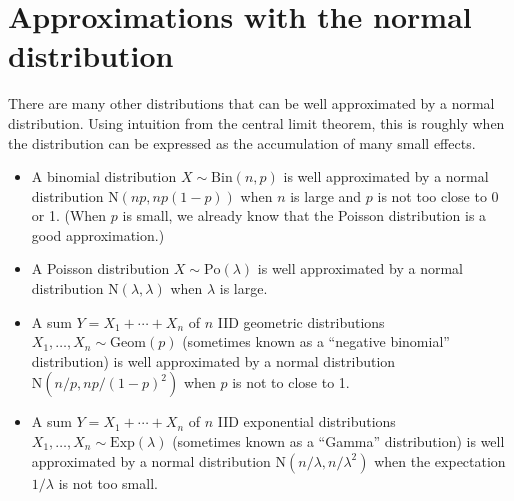 \documentclass[
  a4paper,
]{book}
\providecommand{\tightlist}{%
  \setlength{\itemsep}{0pt}\setlength{\parskip}{0pt}}
\theoremstyle{definition}
\theoremstyle{definition}
\theoremstyle{definition}
\theoremstyle{definition}
\theoremstyle{remark}
\begin{document}
\hypertarget{normal-approx}{%
\section{Approximations with the normal distribution}\label{normal-approx}}

There are many other distributions that can be well approximated by a normal distribution. Using intuition from the central limit theorem, this is roughly when the distribution can be expressed as the accumulation of many small effects.

\begin{itemize}
\tightlist
\item
  A binomial distribution \(X \sim \mathrm{Bin}(n, p)\) is well approximated by a normal distribution \(\mathrm{N}(np, np(1-p))\) when \(n\) is large and \(p\) is not too close to 0 or 1. (When \(p\) is small, we already know that the Poisson distribution is a good approximation.)
\item
  A Poisson distribution \(X \sim \mathrm{Po}(\lambda)\) is well approximated by a normal distribution \(\mathrm{N}(\lambda, \lambda)\) when \(\lambda\) is large.
\item
  A sum \(Y = X_1 + \cdots + X_n\) of \(n\) IID geometric distributions \(X_1, \dots, X_n \sim \mathrm{Geom}(p)\) (sometimes known as a ``negative binomial'' distribution) is well approximated by a normal distribution \(\mathrm{N}(n/p, np/(1-p)^2)\) when \(p\) is not to close to 1.
\item
  A sum \(Y = X_1 + \cdots + X_n\) of \(n\) IID exponential distributions \(X_1, \dots, X_n \sim \mathrm{Exp}(\lambda)\) (sometimes known as a ``Gamma'' distribution) is well approximated by a normal distribution \(\mathrm{N}(n/\lambda, n/\lambda^2)\) when the expectation \(1/\lambda\) is not too small.
\end{itemize}
\end{document}
